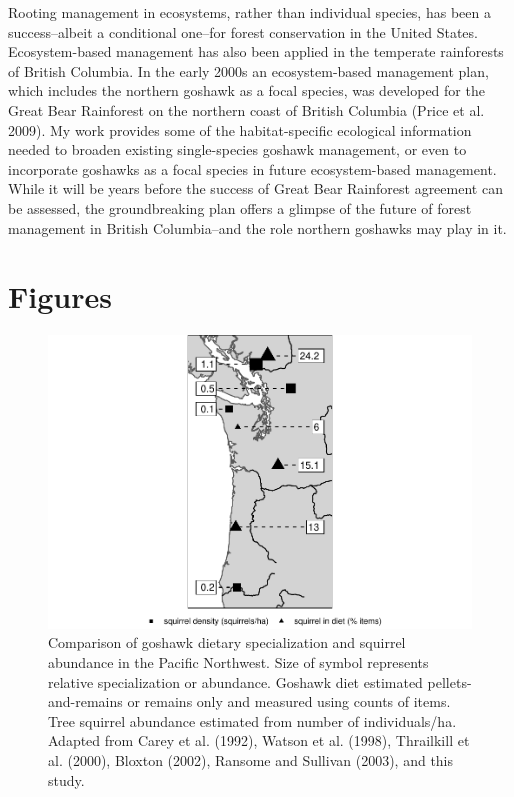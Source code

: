 \documentclass{sfuthesis}
\begin{document}
Rooting management in ecosystems, rather than individual species, has been a success--albeit a conditional one--for forest conservation in the United States. Ecosystem-based management has also been applied in the temperate rainforests of British Columbia. In the early 2000s an ecosystem-based management plan, which includes the northern goshawk as a focal species, was developed for the Great Bear Rainforest on the northern coast of British Columbia (Price et al. 2009). My work provides some of the habitat-specific ecological information needed to broaden existing single-species goshawk management, or even to incorporate goshawks as a focal species in future ecosystem-based management. While it will be years before the success of Great Bear Rainforest agreement can be assessed, the groundbreaking plan offers a glimpse of the future of forest management in British Columbia--and the role northern goshawks may play in it.

\hypertarget{figures}{%
\section{Figures}\label{figures}}

\begin{figure}
\includegraphics[width=1\linewidth]{index_files/figure-latex/squirrel-map-1} \caption{Comparison of goshawk dietary specialization and squirrel abundance in the Pacific Northwest. Size of symbol represents relative specialization or abundance. Goshawk diet estimated pellets-and-remains or remains only and measured using counts of items. Tree squirrel abundance estimated from number of individuals/ha. Adapted from Carey et al. (1992), Watson et al. (1998), Thrailkill et al. (2000), Bloxton (2002), Ransome and Sullivan (2003), and this study.}\label{fig:squirrel-map}
\end{figure}
\end{document}
